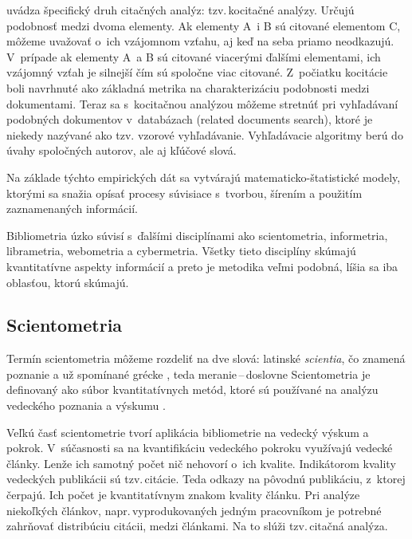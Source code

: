 \citet{Vavrikova2008} uvádza špecifický druh citačných analýz: tzv.\,kocitačné
analýzy.   Určujú podobnosť medzi dvoma elementy. Ak
elementy A~i B sú citované elementom C, môžeme uvažovať o~ich vzájomnom vzťahu,
aj keď na seba priamo neodkazujú. V~prípade ak elementy A~a B sú citované
viacerými ďalšími elementami, ich vzájomný vzťah je silnejší čím sú spoločne
viac citované. Z~počiatku kocitácie boli navrhnuté ako základná metrika na
charakterizáciu podobnosti medzi dokumentami. Teraz sa s~kocitačnou analýzou
môžeme stretnúť pri vyhľadávaní podobných dokumentov v~databázach (related
documents search), ktoré je niekedy nazývané ako  tzv.
vzorové vyhľadávanie. Vyhľadávacie algoritmy berú do úvahy spoločných autorov,
ale aj kľúčové slová.

Na základe týchto empirických dát sa vytvárajú matematicko-štatistické modely,
ktorými sa snažia opísať procesy súvisiace s~tvorbou, šírením a použitím
zaznamenaných informácií.

Bibliometria úzko súvisí s~ďalšími disciplínami ako scientometria, informetria,
librametria, webometria a cybermetria.  Všetky tieto disciplíny skúmajú
kvantitatívne aspekty informácií a preto je metodika veľmi podobná, líšia sa iba
oblasťou, ktorú skúmajú.


\subsection{Scientometria}

Termín scientometria môžeme rozdeliť na dve slová: latinské
\emph{scientia}, čo znamená poznanie a už
spomínané grécke , teda
meranie\,--\,doslovne  Scientometria je
definovaný ako súbor kvantitatívnych metód, ktoré sú používané na
    analýzu vedeckého poznania a výskumu \citep{Hood2001}.

Veľkú časť scientometrie tvorí aplikácia bibliometrie na vedecký výskum a
pokrok.  V~súčasnosti sa na kvantifikáciu vedeckého pokroku využívajú vedecké
články.  Lenže ich samotný počet nič nehovorí o~ich kvalite.  Indikátorom
kvality vedeckých publikácii sú tzv.\,citácie.  Teda odkazy na pôvodnú
publikáciu, z~ktorej čerpajú.  Ich počet je kvantitatívnym znakom kvality
článku.  Pri analýze niekoľkých článkov, napr.\,vyprodukovaných jedným
pracovníkom je potrebné zahrňovať distribúciu citácii, medzi článkami.  Na to
slúži tzv.\,citačná analýza.

